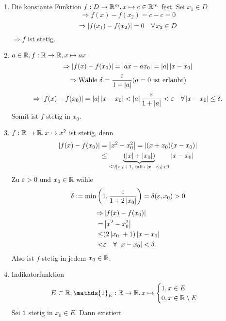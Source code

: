 \documentclass[../ana1.tex]{subfiles}
\begin{document}
\begin{bspe}\leavevmode
    \begin{enumerate}
        \item Die konstante Funktion \( f: D\rightarrow \mathbb{R}^m, 
        x\mapsto c\in\mathbb{R}^m \) fest.
        Sei \( x_1\in D \)
        \[ \Rightarrow f(x) - f(x_2) = c - c = 0 \]
        \[ \Rightarrow \left|f(x_1) - f(x_2)\right| = 0 \quad \forall \, 
        x_2\in D \]
        \(\Rightarrow f\) ist stetig.
        \item \( a\in\mathbb{R}, f:\mathbb{R} \rightarrow \mathbb{R}, x\mapsto ax \)
        \[ \Rightarrow \left| f(x) - f(x_0) \right| = 
        \left| ax - ax_0 \right| = \left|a\right|\left|x-x_0\right| \]
        \[ \Rightarrow \text{Wähle }\delta = 
        \frac{\varepsilon}{1+\left|a\right|} 
        (a=0 \text{ ist erlaubt}) \]
        \[ \Rightarrow \left|f(x) - f(x_0)\right| = \left|a\right|
        \left|x-x_0\right| < \left|a\right| \frac{\varepsilon}{1+\left|a\right|}
        < \varepsilon \quad \forall \left|x-x_0\right| \leq \delta. \]
        Somit ist \(f\) stetig in \(x_0\).
        \item \( f:\mathbb{R}\rightarrow\mathbb{R}, x\mapsto x^2 \)
        ist stetig, denn
        \begin{align*}
            \left| f(x) - f(x_0) \right| &= \left|x^2 - x_0^2\right| 
        = \left| (x+x_0)(x-x_0) \right|\\
            &\leq \underbrace{( \left|x\right| + \left|x_0\right| )}_{
                \leq 2\left|x_0\right|+1, \text{ falls } \left|x-x_0\right| < 1
            } \left|x-x_0\right|
        \end{align*}
        Zu \( \varepsilon > 0 \) und \( x_0 \in\mathbb{R} \) wähle
        \[ \delta := \min \left(1, \frac{\varepsilon}{1 + 2\left|x_0\right|} \right)
        = \delta(\varepsilon, x_0) > 0 \]
        \begin{align*}
            \Rightarrow &\left| f(x) - f(x_0) \right|\\
            = &\left|x^2 - x_0^2\right|\\
            \leq &(2\left|x_0\right| + 1) \left|x-x_0\right|\\
            < &\varepsilon \quad \forall \, \left|x-x_0\right| < \delta.
        \end{align*}
        Also ist \(f\) stetig in jedem \( x_0\in\mathbb{R} \).
        \item Indikatorfunktion 
        \[ E\subset \R, 
        \mathds{1}_E : \R\rightarrow\R, x\mapsto 
        \begin{cases}
            1, x\in E\\
            0, x\in\R \setminus E
        \end{cases} \]
        Sei \( \mathds{1} \) stetig in \( x_0\in E \). Dann existiert

\end{enumerate}
\end{bspe}
\end{document}
